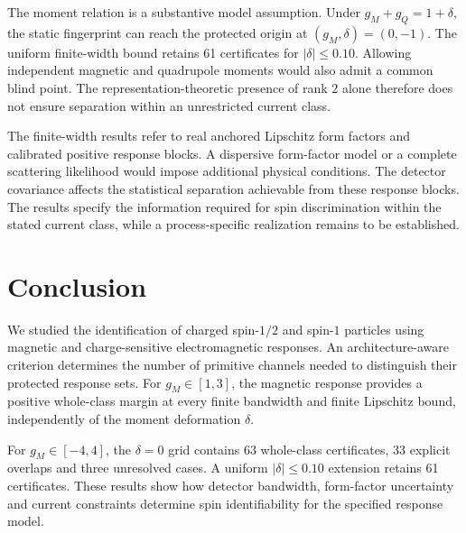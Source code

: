 \documentclass[12pt]{iopjournal}
\theoremstyle{definition}
\theoremstyle{remark}
\begin{document}
The moment relation is a substantive model assumption. Under $g_M+g_Q=1+\delta$, the static fingerprint can reach the protected origin at $(g_M,\delta)=(0,-1)$. The uniform finite-width bound retains 61 certificates for $|\delta|\le0.10$. Allowing independent magnetic and quadrupole moments would also admit a common blind point. The representation-theoretic presence of rank $2$ alone therefore does not ensure separation within an unrestricted current class.

The finite-width results refer to real anchored Lipschitz form factors and calibrated positive response blocks. A dispersive form-factor model or a complete scattering likelihood would impose additional physical conditions. The detector covariance affects the statistical separation achievable from these response blocks. The results specify the information required for spin discrimination within the stated current class, while a process-specific realization remains to be established.

\section{Conclusion}
\label{sec:conclusion}

We studied the identification of charged spin-$1/2$ and spin-$1$ particles using magnetic and charge-sensitive electromagnetic responses. An architecture-aware criterion determines the number of primitive channels needed to distinguish their protected response sets. For $g_M\in[1,3]$, the magnetic response provides a positive whole-class margin at every finite bandwidth and finite Lipschitz bound, independently of the moment deformation $\delta$.

For $g_M\in[-4,4]$, the $\delta=0$ grid contains 63 whole-class certificates, 33 explicit overlaps and three unresolved cases. A uniform $|\delta|\le0.10$ extension retains 61 certificates. These results show how detector bandwidth, form-factor uncertainty and current constraints determine spin identifiability for the specified response model.


\end{document}
